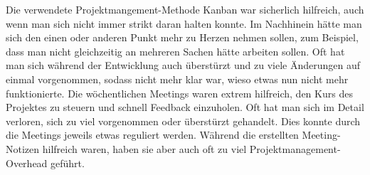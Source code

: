 Die verwendete Projektmangement-Methode Kanban war sicherlich hilfreich,
auch wenn man sich nicht immer strikt daran halten konnte.
Im Nachhinein hätte man sich den einen oder anderen Punkt mehr zu Herzen nehmen sollen,
zum Beispiel, dass man nicht gleichzeitig an mehreren Sachen hätte arbeiten sollen.
Oft hat man sich während der Entwicklung auch überstürzt und zu viele Änderungen auf einmal vorgenommen, sodass nicht mehr klar war, wieso etwas nun nicht mehr funktionierte.
Die wöchentlichen Meetings waren extrem hilfreich, den Kurs des Projektes zu steuern und schnell Feedback einzuholen.
Oft hat man sich im Detail verloren, sich zu viel vorgenommen oder überstürzt gehandelt.
Dies konnte durch die Meetings jeweils etwas reguliert werden.
Während die erstellten Meeting-Notizen hilfreich waren, haben sie aber auch oft zu viel Projektmanagement-Overhead geführt.

